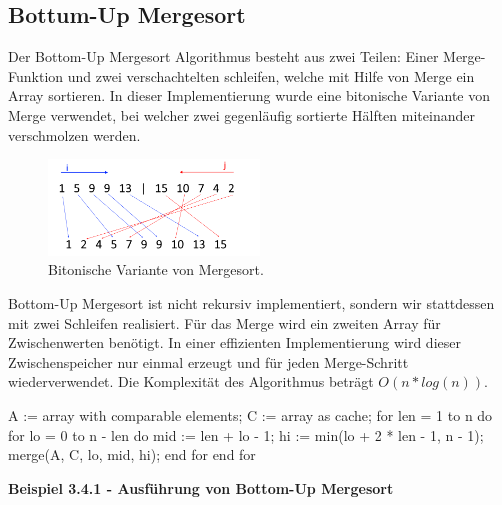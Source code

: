 \subsection{Bottum-Up Mergesort}

Der Bottom-Up Mergesort Algorithmus besteht aus zwei Teilen: Einer Merge-Funktion und zwei verschachtelten schleifen, welche mit Hilfe von Merge ein Array sortieren. In dieser Implementierung wurde eine bitonische Variante von Merge verwendet, bei welcher zwei gegenläufig sortierte Hälften miteinander verschmolzen werden.


\begin{figure}[htbp] 
	\centering
	\includegraphics[width=0.5\textwidth]{./img/bionic-merge}
	\caption{Bitonische Variante von Mergesort.}
\end{figure}

\noindent
Bottom-Up Mergesort ist nicht rekursiv implementiert, sondern wir stattdessen mit zwei Schleifen realisiert. Für das Merge wird ein zweiten Array für Zwischenwerten benötigt. In einer effizienten Implementierung wird dieser Zwischenspeicher nur einmal erzeugt und für jeden Merge-Schritt wiederverwendet. Die Komplexität des Algorithmus beträgt $O(n*log(n))$.

\begin{PseudoCode}
	A := array with comparable elements;
	C := array as cache;
	for len = 1 to n do
		for lo = 0 to n - len do
			mid := len + lo - 1;
			hi := min(lo + 2 * len - 1, n - 1);
			merge(A, C, lo, mid, hi);
		end for	
	end for
\end{PseudoCode}

\noindent
\textbf{Beispiel 3.4.1 - Ausführung von Bottom-Up Mergesort}

